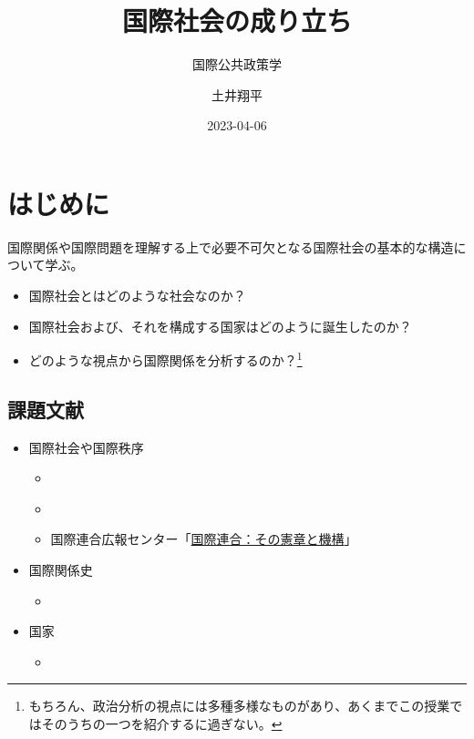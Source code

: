 \documentclass[
  xelatex,
  ja=standard]{bxjsarticle}
\title{国際社会の成り立ち}
\subtitle{国際公共政策学}
\author{土井翔平}
\date{2023-04-06}
\providecommand{\tightlist}{%
  \setlength{\itemsep}{0pt}\setlength{\parskip}{0pt}}\usepackage{longtable,booktabs,array}
\begin{document}
\maketitle
\ifdefined\Shaded\renewenvironment{Shaded}{\begin{tcolorbox}[interior hidden, borderline west={3pt}{0pt}{shadecolor}, enhanced, breakable, boxrule=0pt, sharp corners, frame hidden]}{\end{tcolorbox}}\fi

\hypertarget{ux306fux3058ux3081ux306b}{%
\section*{はじめに}\label{ux306fux3058ux3081ux306b}}

国際関係や国際問題を理解する上で必要不可欠となる国際社会の基本的な構造について学ぶ。

\begin{itemize}
\tightlist
\item
  国際社会とはどのような社会なのか？
\item
  国際社会および、それを構成する国家はどのように誕生したのか？
\item
  どのような視点から国際関係を分析するのか？\footnote{もちろん、政治分析の視点には多種多様なものがあり、あくまでこの授業ではそのうちの一つを紹介するに過ぎない。}
\end{itemize}

\hypertarget{ux8ab2ux984cux6587ux732e}{%
\subsection*{課題文献}\label{ux8ab2ux984cux6587ux732e}}

\begin{itemize}
\tightlist
\item
  国際社会や国際秩序

  \begin{itemize}
  \tightlist
  \item
    \citet[第3章]{nakanishi2013}
  \item
    \citet{shinoda2007}
  \item
    国際連合広報センター「\href{https://www.unic.or.jp/info/un/}{国際連合：その憲章と機構}」
  \end{itemize}
\item
  国際関係史

  \begin{itemize}
  \tightlist
  \item
    \citet[第2章]{nakanishi2013}
  \end{itemize}
\item
  国家

  \begin{itemize}
  \tightlist
  \item
    \citet[第2章]{sunahara2020}
  \end{itemize}
\end{itemize}
\end{document}
